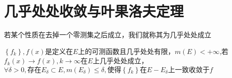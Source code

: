 \documentclass[lang=cn,14pt]{elegantbook}
\begin{document}
	\section{几乎处处收敛与叶果洛夫定理}
	\begin{definition}[几乎处处]
		若某个性质在去掉一个零测集之后成立，我们就称其为几乎处处成立
	\end{definition}
	\begin{theorem}[叶果洛夫定理]
		$\left\{ f_k \right\} ,f\left( x \right) \text{是定义在}E\text{上的可测函数且几乎处处有限，}m\left( E \right) <+\infty $,若$f_k\left( x \right) \rightarrow f\left( x \right) ,k\rightarrow \infty \text{在}E\text{上几乎处处成立}$，$\forall \delta >0,\text{存在}E_{\delta}\subset E,m\left( E_{\delta} \right) \le \delta ,\text{使得}\left\{ f_k \right\} \text{在}E-E_{\delta}\text{上一致收敛于}f$		
	\end{theorem}
\end{document}

